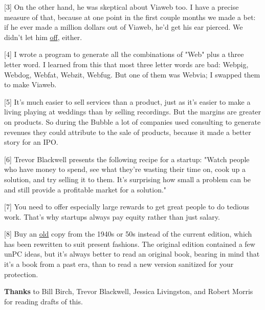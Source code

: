 [3] On the other hand, he was skeptical about Viaweb too. I
                  have a precise measure of that, because at one point in the
                  first couple months we made a bet: if he ever made a million
                  dollars out of Viaweb, he'd get his ear pierced. We didn't let
                  him \href{http://www.paulgraham.com/pierced.html}{off}, either.

[4] I wrote a program to generate all the combinations of "Web"
                  plus a three letter word. I learned from this that most three
                  letter words are bad: Webpig, Webdog, Webfat, Webzit, Webfug.
                  But one of them was Webvia; I swapped them to make Viaweb.

[5] It's much easier to sell services than a product, just as
                  it's easier to make a living playing at weddings than by
                  selling recordings. But the margins are greater on products.
                  So during the Bubble a lot of companies used consulting to
                  generate revenues they could attribute to the sale of
                  products, because it made a better story for an IPO.

[6] Trevor Blackwell presents the following recipe for a
                  startup: "Watch people who have money to spend, see what
                  they're wasting their time on, cook up a solution, and try
                  selling it to them. It's surprising how small a problem can be
                  and still provide a profitable market for a solution."

[7] You need to offer especially large rewards to get great
                  people to do tedious work. That's why startups always pay
                  equity rather than just salary.

[8] Buy an
                  \href{http://dogbert.abebooks.com/servlet/SearchResults?bx=on\&sts=t\&ds=30\&bi=0\&an=carnegie\&kn=1938+OR+1939+OR+1940+OR+1941+OR+1942+OR+1943+OR+1944+OR+1945+OR+1946+OR+1947+OR+1948\&tn=influence+friends\&sortby=2}{old}
                  copy from the 1940s or 50s instead of the current edition,
                  which has been rewritten to suit present fashions. The
                  original edition contained a few unPC ideas, but it's always
                  better to read an original book, bearing in mind that it's a
                  book from a past era, than to read a new version sanitized for
                  your protection.

\textbf{Thanks} to Bill Birch,
                  Trevor Blackwell, Jessica Livingston, and Robert Morris for
                  reading drafts of this.


              
            
          
